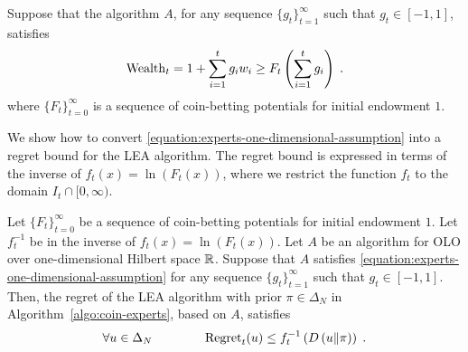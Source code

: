 
Suppose that the algorithm $A$, for any sequence
$\{g_t\}_{t=1}^\infty$ such that $g_t \in [-1,1]$, satisfies
\begin{equation}
\label{equation:experts-one-dimensional-assumption}
\operatorname{Wealth}_t = 1 + \sum_{i=1}^t g_i w_i \ge F_t\left(\sum_{i=1}^t g_i\right) \; .
\end{equation}
where $\{F_t\}_{t=0}^\infty$ is a sequence of coin-betting potentials for
initial endowment $1$.

We show how to convert \eqref{equation:experts-one-dimensional-assumption} into
a regret bound for the LEA algorithm. The regret bound is expressed in terms
of the inverse of $f_t(x) = \ln(F_t(x))$, where we restrict the function $f_t$ to the domain $I_t \cap [0, \infty)$.

\begin{theorem}
\label{theorem:regret-bound-experts}
Let $\{F_t\}_{t=0}^\infty$ be a sequence of coin-betting potentials for initial
endowment $1$. Let $f_t^{-1}$ be in the inverse of $f_t(x) = \ln(F_t(x))$.
Let $A$ be an algorithm for OLO over one-dimensional Hilbert space
$\mathbb{R}$. Suppose that $A$ satisfies
\eqref{equation:experts-one-dimensional-assumption} for any sequence
$\{g_t\}_{t=1}^\infty$ such that $g_t \in [-1,1]$. Then, the regret of the
LEA algorithm with prior $\pi \in \Delta_N$ in Algorithm~\ref{algo:coin-experts}, based on $A$, satisfies
$$
\forall u \in \Delta_N \qquad \qquad
\operatorname{Regret}_t(u) \le f_t^{-1}\left( D\left({u}\middle\|{\pi}\right) \right) \; .
$$
\end{theorem}


